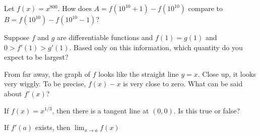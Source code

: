 \documentclass{ximera}
\newcommand{\recommendation}[1]{}
\newcommand{\GoodQuestions}[1]{}
\begin{document}
\begin{shuffle}
\begin{problem}
  Let $f(x) = x^{800}$.  How does $A = f(10^{10} + 1) - f(10^{10})$ compare to $B = f(10^{10}) - f(10^{10} - 1)$?
  \begin{multipleChoice}
  \end{multipleChoice}
\end{problem}

\begin{problem}
  Suppose $f$ and $g$ are differentiable functions and $f(1) = g(1)$ and 
  $0 > f'(1) > g'(1)$.  Based only on this information, which quantity
  do you expect to be largest?
  \begin{multipleChoice}
  \end{multipleChoice}
\end{problem}



\begin{problem}
  From far away, the graph of $f$ looks like the straight line
  $y = x$.  Close up, it looks very wiggly.  To be precise, $f(x) - x$
  is very close to zero.  What can be said about $f'(x)$?
  \begin{multipleChoice}
  \end{multipleChoice}
\end{problem}

\begin{problem}

  If $f(x)=x^{1/3}$, then there is a
  tangent line at $(0,0)$.  Is this true or false?
  \begin{multipleChoice}
  \end{multipleChoice}
\end{problem}

\begin{problem}
  If $f'(a)$ exists, then $\lim_{x\to a}f(x)$
  \begin{multipleChoice}
  \end{multipleChoice}
\end{problem}



\end{shuffle}
\end{document}
